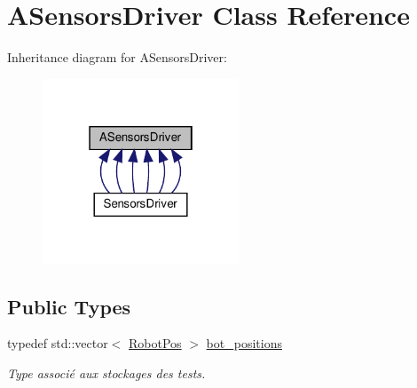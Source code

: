 \hypertarget{classASensorsDriver}{}\section{A\+Sensors\+Driver Class Reference}
\label{classASensorsDriver}


Inheritance diagram for A\+Sensors\+Driver\+:
\nopagebreak
\begin{figure}[H]
\begin{center}
\leavevmode
\includegraphics[width=166pt]{classASensorsDriver__inherit__graph}
\end{center}
\end{figure}
\subsection*{Public Types}
\begin{DoxyCompactItemize}
\item 
\mbox{\label{classASensorsDriver_a9743a29ef7d4faebd915f096f07bf729}} 
typedef std\+::vector$<$ \hyperlink{classRobotPos}{Robot\+Pos} $>$ \hyperlink{classASensorsDriver_a9743a29ef7d4faebd915f096f07bf729}{bot\+\_\+positions}
\begin{DoxyCompactList}\small\item\em Type associé aux stockages des tests. \end{DoxyCompactList}\end{DoxyCompactItemize}
